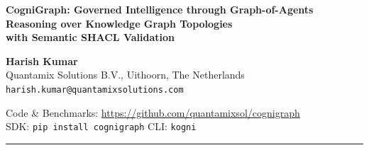 \documentclass[a4paper,11pt]{article}
\theoremstyle{definition}
\begin{document}
\begin{center}
\vspace*{3mm}

{\Large\bfseries\color{darkblue}%
CogniGraph: Governed Intelligence through Graph-of-Agents\\[6pt]
Reasoning over Knowledge Graph Topologies\\[6pt]
with Semantic SHACL Validation}

\vspace{5mm}

{\large\bfseries Harish Kumar}\\[2mm]
{\normalsize Quantamix Solutions B.V., Uithoorn, The Netherlands}\\[1mm]
{\normalsize\texttt{harish.kumar@quantamixsolutions.com}}

\vspace{3mm}

{\small Code \& Benchmarks: \url{https://github.com/quantamixsol/cognigraph}}\\
{\small SDK: \texttt{pip install cognigraph} \quad CLI: \texttt{kogni}}

\vspace{3mm}
\noindent\rule{0.85\textwidth}{0.5pt}
\end{center}
\end{document}
